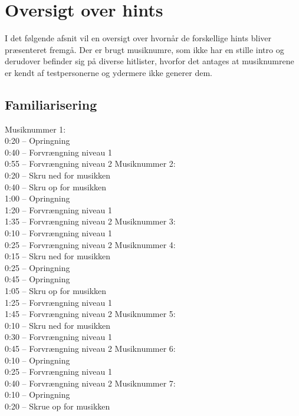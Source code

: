 \chapter{Oversigt over hints}
\label{app:OversigtHints}
%
I det følgende afsnit vil en oversigt over hvornår de forskellige hints bliver præsenteret fremgå. Der er brugt musiknumre, som ikke har en stille intro og derudover befinder sig på diverse hitlister, hvorfor det antages at musiknumrene er kendt af testpersonerne og ydermere ikke generer dem. 

\section{Familiarisering}
Musiknummer 1:\\
0:20 – Opringning\\
0:40 – Forvrængning niveau 1\\
0:55 – Forvrængning niveau 2\blankline
%
Musiknummer 2:\\
0:20 – Skru ned for musikken\\
0:40 – Skru op for musikken\\
1:00 – Opringning\\
1:20 – Forvrængning niveau 1\\
1:35 – Forvrængning niveau 2\blankline
%
Musiknummer 3:\\
0:10 – Forvrængning niveau 1\\
0:25 – Forvrængning niveau 2\blankline
%
Musiknummer 4:\\
0:15 – Skru ned for musikken\\
0:25 – Opringning\\
0:45 – Opringning\\
1:05 – Skru op for musikken\\
1:25 – Forvrængning niveau 1\\
1:45 – Forvrængning niveau 2\blankline 
%
Musiknummer 5:\\
0:10 – Skru ned for musikken\\
0:30 – Forvrængning niveau 1\\
0:45 – Forvrængning niveau 2\blankline 
%
Musiknummer 6:\\
0:10 – Opringning\\
0:25 – Forvrængning niveau 1\\
0:40 – Forvrængning niveau 2\blankline
%
Musiknummer 7:\\
0:10 – Opringning\\
0:20 – Skrue op for musikken
%
